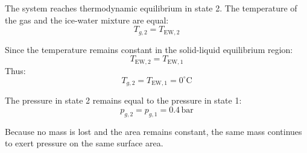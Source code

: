 The system reaches thermodynamic equilibrium in state 2. The temperature of the gas and the ice-water mixture are equal:  
\[
T_{g,2} = T_{\text{EW},2}
\]  

Since the temperature remains constant in the solid-liquid equilibrium region:  
\[
T_{\text{EW},2} = T_{\text{EW},1}
\]  
Thus:  
\[
T_{g,2} = T_{\text{EW},1} = 0^\circ\text{C}
\]  

The pressure in state 2 remains equal to the pressure in state 1:  
\[
p_{g,2} = p_{g,1} = 0.4 \, \text{bar}
\]  

Because no mass is lost and the area remains constant, the same mass continues to exert pressure on the same surface area.
